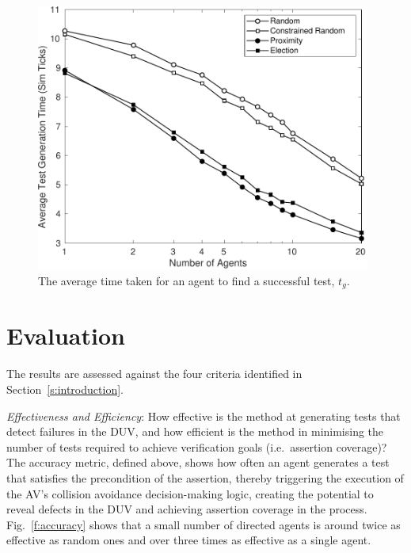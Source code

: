 \documentclass[runningheads,a4paper]{llncs}
\begin{document}
\begin{figure}[!t]
	\centering
\includegraphics[width=0.98\textwidth]{TimeSimTicks.pdf}
	\caption{The average time taken for an agent to find a successful test, $t_{g}$.}
	\label{f:time}
\end{figure}


\section{Evaluation}\label{s:evaluation}
The results are assessed against the four criteria identified in Section~\ref{s:introduction}.

\textit{Effectiveness and Efficiency}: How effective is the method at generating tests that detect failures in the DUV, and how efficient is the method in minimising the number of tests required to achieve verification goals (i.e.\ assertion coverage)? The accuracy metric, defined above, shows how often an agent generates a test that satisfies the precondition of the assertion, thereby triggering the execution of the AV's collision avoidance decision-making logic, creating the potential to reveal defects in the DUV and achieving assertion coverage in the process. Fig.~\ref{f:accuracy} shows that a small number of directed agents is around twice as effective as random ones and over three times as effective as a single agent.
\end{document}
